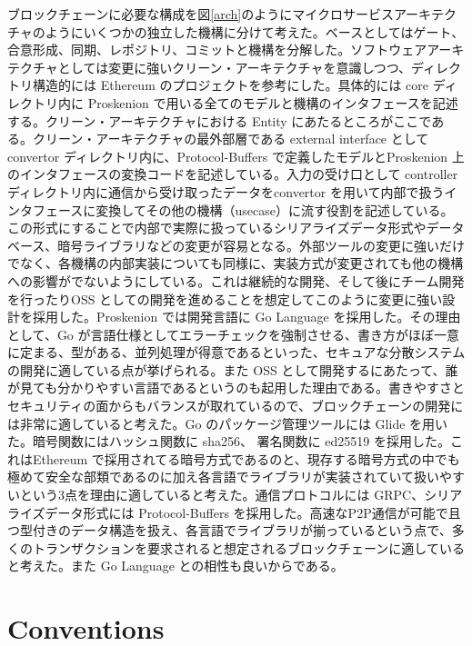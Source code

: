 ブロックチェーンに必要な構成を図\ref{arch}のようにマイクロサービスアーキテクチャのようにいくつかの独立した機構に分けて考えた。ベースとしてはゲート、合意形成、同期、レポジトリ、コミットと機構を分解した。ソフトウェアアーキテクチャとしては変更に強いクリーン・アーキテクチャを意識しつつ、ディレクトリ構造的には
Ethereum のプロジェクトを参考にした。具体的には core ディレクトリ内に
Proskenion
で用いる全てのモデルと機構のインタフェースを記述する。クリーン・アーキテクチャにおける
Entity
にあたるところがここである。クリーン・アーキテクチャの最外部層である
external interface として convertor ディレクトリ内に、Protocol-Buffers
で定義したモデルとProskenion
上のインタフェースの変換コードを記述している。入力の受け口として
controller ディレクトリ内に通信から受け取ったデータをconvertor
を用いて内部で扱うインタフェースに変換してその他の機構（usecase）に流す役割を記述している。この形式にすることで内部で実際に扱っているシリアライズデータ形式やデータベース、暗号ライブラリなどの変更が容易となる。外部ツールの変更に強いだけでなく、各機構の内部実装についても同様に、実装方式が変更されても他の機構への影響がでないようにしている。これは継続的な開発、そして後にチーム開発を行ったりOSS
としての開発を進めることを想定してこのように変更に強い設計を採用した。Proskenion
では開発言語に Go Language を採用した。その理由として、Go
が言語仕様としてエラーチェックを強制させる、書き方がほぼ一意に定まる、型がある、並列処理が得意であるといった、セキュアな分散システムの開発に適している点が挙げられる。また
OSS
として開発するにあたって、誰が見ても分かりやすい言語であるというのも起用した理由である。書きやすさとセキュリティの面からもバランスが取れているので、ブロックチェーンの開発には非常に適していると考えた。Go
のパッケージ管理ツールには Glide を用いた。暗号関数にはハッシュ関数に
sha256、 署名関数に ed25519 を採用した。これはEthereum
で採用されてる暗号方式であるのと、現存する暗号方式の中でも極めて安全な部類であるのに加え各言語でライブラリが実装されていて扱いやすいという3点を理由に適していると考えた。通信プロトコルには
GRPC\cite{3}、シリアライズデータ形式には Protocol-Buffers\cite{4}
を採用した。高速なP2P通信が可能で且つ型付きのデータ構造を扱え、各言語でライブラリが揃っているという点で、多くのトランザクションを要求されると想定されるブロックチェーンに適していると考えた。また
Go Language との相性も良いからである。

\hypertarget{conventions}{%
\section{Conventions}\label{conventions}}

